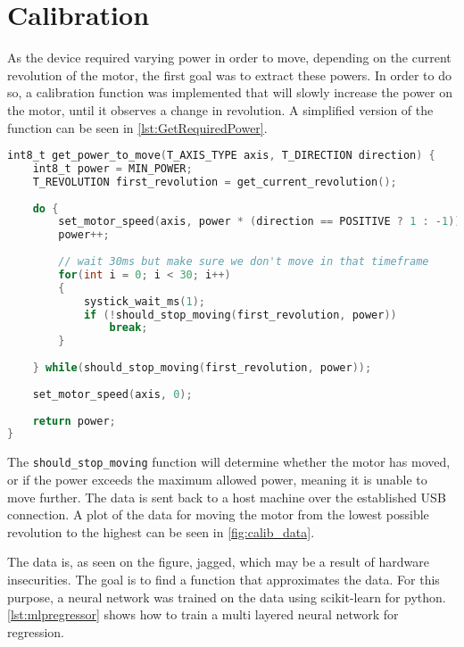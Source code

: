 \section{Calibration}\label{sec:conclusion}

As the device required varying power in order to move, depending on the current revolution of the motor, the first goal was to extract these powers.
In order to do so, a calibration function was implemented that will slowly increase the power on the motor, until it observes a change in revolution.
A simplified version of the function can be seen in \autoref{lst:GetRequiredPower}.


\begin{lstlisting}[language=C,label={lst:GetRequiredPower},caption={Getting required power to move }]
int8_t get_power_to_move(T_AXIS_TYPE axis, T_DIRECTION direction) {
	int8_t power = MIN_POWER;
	T_REVOLUTION first_revolution = get_current_revolution();
	
	do {
		set_motor_speed(axis, power * (direction == POSITIVE ? 1 : -1));
		power++;
		
		// wait 30ms but make sure we don't move in that timeframe
		for(int i = 0; i < 30; i++)
		{
			systick_wait_ms(1);
			if (!should_stop_moving(first_revolution, power))
				break;
		}
	
	} while(should_stop_moving(first_revolution, power));
	
	set_motor_speed(axis, 0);
	
	return power;
}

\end{lstlisting}

The \texttt{should\_stop\_moving} function will determine whether the motor has moved, or if the power exceeds the maximum allowed power, meaning it is unable to move further.
The data is sent back to a host machine over the established USB connection.
A plot of the data for moving the motor from the lowest possible revolution to the highest can be seen in \autoref{fig:calib_data}.


The data is, as seen on the figure, jagged, which may be a result of hardware insecurities.
The goal is to find a function that approximates the data.
For this purpose, a neural network was trained on the data using scikit-learn for python.
\autoref{lst:mlpregressor} shows how to train a multi layered neural network for regression.

